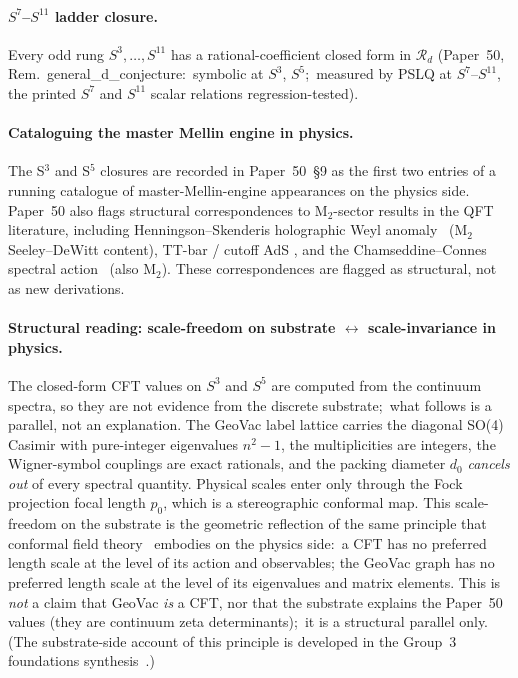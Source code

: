 \documentclass[11pt,a4paper]{article}
\theoremstyle{plain}
\theoremstyle{definition}
\newcommand{\sthree}{S^{3}}
\newcommand{\sfive}{S^{5}}
\begin{document}
\paragraph{$S^{7}$--$S^{11}$ ladder closure.}
Every odd rung $S^{3}, \dots, S^{11}$ has a rational-coefficient
closed form in $\mathcal{R}_{d}$ (Paper~50,
Rem.~general\_d\_conjecture:\ symbolic at $S^{3}$, $S^{5}$;\ measured
by PSLQ at $S^{7}$--$S^{11}$, the printed $S^{7}$ and $S^{11}$ scalar
relations regression-tested).

\paragraph{Cataloguing the master Mellin engine in physics.}
The S$^{3}$ and S$^{5}$ closures are recorded in Paper~50~\S 9 as the
first two entries of a running catalogue of master-Mellin-engine
appearances on the physics side.  Paper~50 also flags structural
correspondences to M$_{2}$-sector results in the QFT literature,
including Henningson--Skenderis holographic Weyl
anomaly~\cite{henningson_skenderis1998} (M$_{2}$ Seeley--DeWitt
content), TT-bar / cutoff AdS \cite{hartman_etal2019}, and the
Chamseddine--Connes spectral action~\cite{chamseddine_connes2010}
(also M$_{2}$).  These correspondences are flagged as structural, not
as new derivations.

\paragraph{Structural reading: scale-freedom on substrate
$\leftrightarrow$ scale-invariance in physics.}
The closed-form CFT values on $\sthree$ and $\sfive$ are computed
from the continuum spectra, so they are not evidence from the discrete
substrate;\ what follows is a parallel, not an explanation.  The GeoVac
label lattice carries the diagonal SO(4) Casimir with pure-integer
eigenvalues $n^{2} - 1$, the multiplicities are integers, the
Wigner-symbol couplings are exact rationals, and the packing diameter
$d_{0}$ \emph{cancels out} of every spectral quantity.  Physical scales
enter only through the Fock projection focal length $p_{0}$, which is
a stereographic conformal map.  This scale-freedom on the substrate is
the geometric reflection of the same principle that conformal field
theory~\cite{klebanov_pufu_safdi2011} embodies on the physics side:\
a CFT has no preferred length scale at the level of its action and
observables; the GeoVac graph has no preferred length scale at the
level of its eigenvalues and matrix elements.  This is \emph{not} a
claim that GeoVac \emph{is} a CFT, nor that the substrate explains the
Paper~50 values (they are continuum zeta determinants);\ it is a
structural parallel only.  (The substrate-side
account of this principle is developed in the Group~3 foundations
synthesis~\cite{geovac_g3_synthesis}.)
\end{document}

